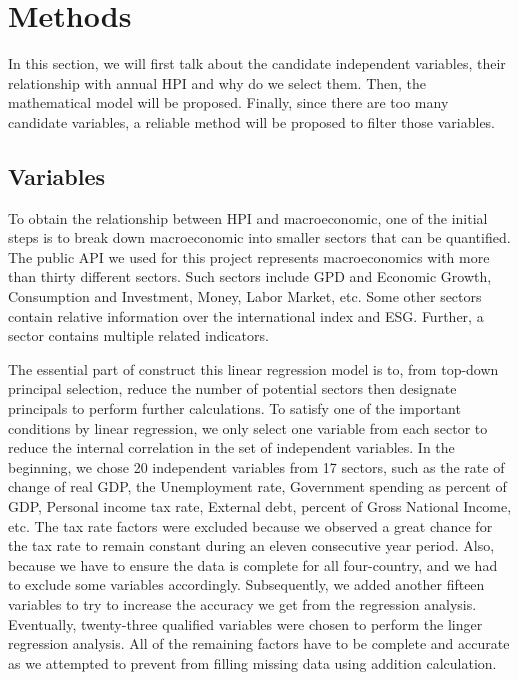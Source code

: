 \documentclass[11pt]{article}
\begin{document}
\section{Methods}\label{methods}
In this section, we will first talk about the candidate independent variables, their relationship with annual HPI and why do we select them. Then, the mathematical model will be proposed. Finally, since there are too many candidate variables, a reliable method will be proposed to filter those variables.

\subsection{Variables}\label{variables}
To obtain the relationship between HPI and macroeconomic, one of the initial steps is to break down macroeconomic into smaller sectors that can be quantified. The public API we used for this project represents macroeconomics with more than thirty different sectors. Such sectors include GPD and Economic Growth, Consumption and Investment, Money, Labor Market, etc. Some other sectors contain relative information over the international index and ESG. Further, a sector contains multiple related indicators.

The essential part of construct this linear regression model is to, from top-down principal selection, reduce the number of potential sectors then designate principals to perform further calculations.  To satisfy one of the important conditions by linear regression, we only select one variable from each sector to reduce the internal correlation in the set of independent variables. In the beginning, we chose 20 independent variables from 17 sectors, such as the rate of change of real GDP, the Unemployment rate, Government spending as percent of GDP, Personal income tax rate,     External debt, percent of Gross National Income, etc. The tax rate factors were excluded because we observed a great chance for the tax rate to remain constant during an eleven consecutive year period. Also, because we have to ensure the data is complete for all four-country, and we had to exclude some variables accordingly. Subsequently, we added another fifteen variables to try to increase the accuracy we get from the regression analysis. Eventually, twenty-three qualified variables were chosen to perform the linger regression analysis. All of the remaining factors have to be complete and accurate as we attempted to prevent from filling missing data using addition calculation. 
\end{document}
